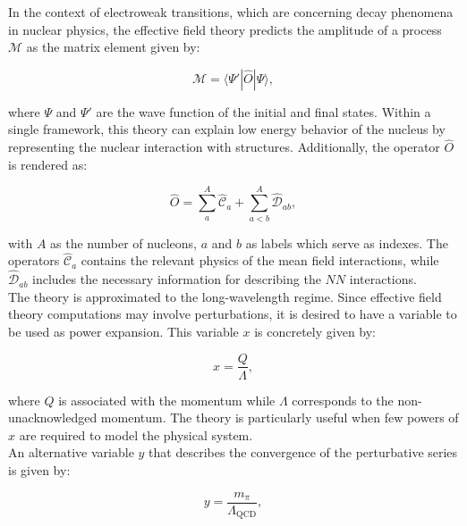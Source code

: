 \documentclass[openany]{book}
\begin{document}
In the context of electroweak transitions, which are concerning decay phenomena in nuclear physics, the effective field theory predicts the amplitude of a process $\mathcal{M}$ as the matrix element given by:

\begin{equation}\label{micro_EFT_ppCNO_matrix}
	\mathcal{M}=  \langle  \Psi' | \hat {O}  | \Psi  \rangle,
\end{equation}

where $\Psi$ and $\Psi'$ are the wave function of the initial and final states. Within a single framework, this theory can explain low energy behavior of the nucleus by representing the nuclear interaction with structures. Additionally, the operator $\hat O $ is rendered as: 

\begin{equation}\label{micro_EFT_ppCNO_operator}
	 \hat O = \sum_{a}^{A} { \hat {\mathcal{C}}_a } + \sum_{a < b}^{A} { \hat{\mathcal{D}}_{ab}},
\end{equation}

with $A$ as the number of nucleons, $a$ and $b$ as labels which serve as indexes. The operators $\hat {\mathcal{C}}_a$ contains the relevant physics of the mean field interactions, while $\hat{\mathcal{D}}_{ab}$ includes the necessary information for describing the $NN$ interactions. \\

The theory is approximated to the long-wavelength regime. Since effective field theory computations may involve perturbations, it is desired to have a variable to be used as power expansion. This variable $x$ is concretely given by:

\begin{equation}\label{micro_EFT_ppCNO_expansionVariable}
	x  = \frac{Q}{\Lambda},
\end{equation}

where $Q$ is associated with the momentum while $\Lambda$
corresponds to the non-unacknowledged momentum. The theory is particularly useful when few powers of $x$ are required to model the physical system. \\

An alternative variable $y$ that describes the convergence of the perturbative series is given by:

 \begin{equation}\label{micro_EFT_ppCNO_expansionVariable_QCD}
 	y = \frac{m_\pi}{\Lambda_{\mathrm{QCD}}},
 \end{equation}
\end{document}
